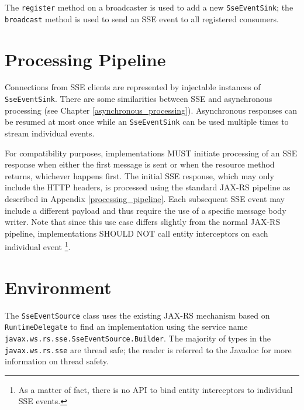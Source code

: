 The \lstinline{register} method on a broadcaster is used to add a new \lstinline{SseEventSink}; the
\lstinline{broadcast} method is used to send an SSE event to all registered consumers.

\section{Processing Pipeline}
\label{sse_pipeline}

Connections from SSE clients are represented by injectable instances of \lstinline{SseEventSink}. There are some
similarities between SSE and asynchronous processing (see Chapter \ref{asynchronous_processing}). Asynchronous responses
can be resumed at most once while an \lstinline{SseEventSink} can be used multiple times to stream individual events.

For compatibility purposes, implementations MUST initiate processing of an SSE response when either the first message is
sent or when the resource method returns, whichever happens first. The initial SSE response, which may only include the
HTTP headers, is processed using the standard JAX-RS pipeline as described in Appendix \ref{processing_pipeline}. Each
subsequent SSE event may include a different payload and thus require the use of a specific message body writer. Note
that since this use case differs slightly from the normal JAX-RS pipeline, implementations SHOULD NOT call entity
interceptors on each individual event \footnote{As a matter of fact, there is no API to bind entity interceptors to
individual SSE events.}.

\section{Environment}
\label{sse_environment}

The \lstinline{SseEventSource} class uses the existing JAX-RS mechanism based on \lstinline{RuntimeDelegate} to find an
implementation using the service name \lstinline{javax.ws.rs.sse.SseEventSource.Builder}. The majority of types in the
\lstinline{javax.ws.rs.sse} are thread safe; the reader is referred to the Javadoc for more information on thread
safety.
